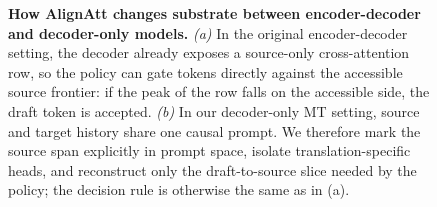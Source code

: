 \begin{figure}[t]
{
}%
\caption{\textbf{How AlignAtt changes substrate between encoder-decoder and
decoder-only models.} \emph{(a)} In the original encoder-decoder setting,
the decoder already exposes a source-only cross-attention row, so the policy
can gate tokens directly against the accessible source frontier: if the peak
of the row falls on the accessible side, the draft token is accepted.
\emph{(b)} In our decoder-only MT setting, source and target history share
one causal prompt. We therefore mark the source span explicitly in prompt
space, isolate translation-specific heads, and reconstruct only the
draft-to-source slice needed by the policy; the decision rule is otherwise
the same as in (a).}
\label{fig:alignatt-substrates}
\end{figure}
